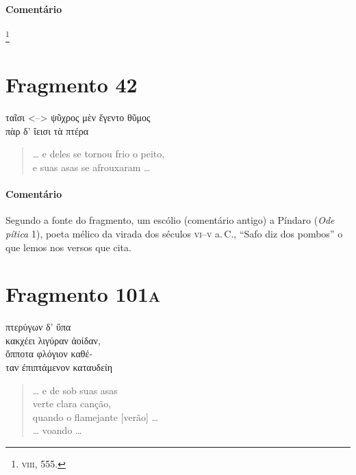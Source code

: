 \medskip

\paragraph{Comentário} \footnote{\textsc{viii}, 555.} 


\section{Fragmento 42}

\begin{gkverse}
ταῖσι <--> ψῦχρος μὲν ἔγεντο θῦμος\\
πὰρ δ’ ἴεισι τὰ πτέρα
\end{gkverse}

\begin{verse}
\ldots{} e deles se tornou frio o peito,\\
e suas asas se afrouxaram \ldots{}
\end{verse}

\medskip

{\paragraph{Comentário} Segundo a fonte do fragmento, um escólio (comentário antigo) a Píndaro
(\emph{Ode pítica} 1), poeta mélico da virada dos séculos \textsc{vi}--\textsc{v} a.\,C.,
``Safo diz dos pombos'' o que lemos nos versos que cita.}


\section{Fragmento 101\textsc{a}}

\begin{gkverse}
πτερύγων δ’ ὔπα\\
κακχέει λιγύραν ἀοίδαν,\\
ὄπποτα φλόγιον \dagger{}καθέ-\\
ταν\dagger{} ἐπιπτάμενον \dagger{}καταυδείη\dagger{}
\end{gkverse}

\begin{verse}
\ldots{} e de sob suas asas\\
verte clara canção,\\
quando o flamejante [verão] \ldots{}\\
\ldots{} voando \ldots{}
\end{verse}

